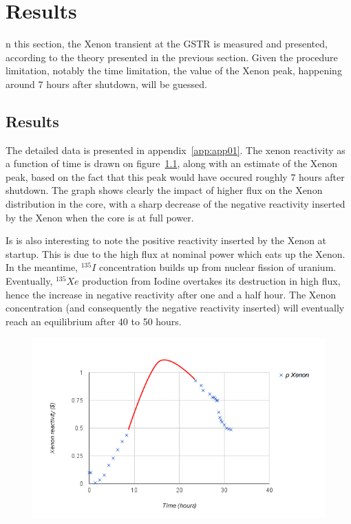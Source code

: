 %
%
\let\textcircled=\pgftextcircled
\chapter{Results}
\label{chap:result}

n this section, the Xenon transient at the GSTR is measured and presented, according to the theory presented in the previous section. Given the procedure limitation, notably the time limitation, the value of the Xenon peak, happening around 7 hours after shutdown, will be guessed.

\section{Results}

The detailed data is presented in appendix~\ref{app:app01}. The xenon reactivity as a function of time is drawn on figure~\ref{fig:xenon}, along with an estimate of the Xenon peak, based on the fact that this peak would have occured roughly 7 hours after shutdown. The graph shows clearly the impact of higher flux on the Xenon distribution in the core, with a sharp decrease of the negative reactivity inserted by the Xenon when the core is at full power.

Is is also interesting to note the positive reactivity inserted by the Xenon at startup. This is due to the high flux at nominal power which eats up the Xenon. In the meantime, $^{135}I$ concentration builds up from nuclear fission of uranium. Eventually, $^{135}Xe$ production from Iodine overtakes its destruction in high flux, hence the increase in negative reactivity after one and a half hour. The Xenon concentration (and consequently the negative reactivity inserted) will eventually reach an equilibrium after 40 to 50 hours.

\begin{figure}[t!]
	\centering
	\includegraphics[height=0.4\textheight]{fig02/xenon.png}
	\label{fig:xenon}
\end{figure}

